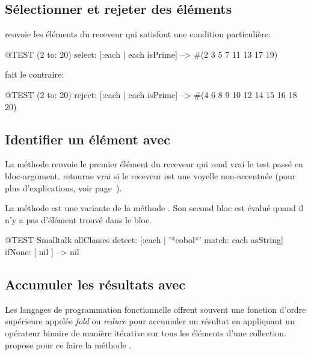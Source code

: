 \documentclass[a4paper,10pt,twoside]{book}
\begin{document}
\subsection{S\'electionner et rejeter des \'el\'ements}

 renvoie les \'el\'ements du receveur qui satisfont
une condition particuli\`ere:

\begin{code}{@TEST}
(2 to: 20) select: [:each | each isPrime] --> #(2 3 5 7 11 13 17 19)
\end{code}

 fait le contraire:
\begin{code}{@TEST}
(2 to: 20) reject: [:each | each isPrime] --> #(4 6 8 9 10 12 14 15 16 18 20)
\end{code}

\subsection{Identifier un \'el\'ement avec }

La m\'ethode  renvoie le premier
\'el\'ement du receveur qui rend vrai le test pass\'e en bloc-argument.
 retourne vrai \cad {} si le receveur est une
voyelle non-accentu\'ee (pour plus d'explications, voir page~\pageref{def:isVowel}).

La m\'ethode  est une variante de la m\'ethode . Son second bloc est \'evalu\'e quand il n'y a pas d'\'el\'ement trouv\'e dans le bloc.

\begin{code}{@TEST}
Smalltalk allClasses detect: [:each | '*cobol*' match: each asString] ifNone: [ nil ] --> nil
\end{code} %

\subsection{Accumuler les r\'esultats avec }
Les langages de programmation fonctionnelle offrent souvent une fonction d'ordre
sup\'erieure appel\'ee \emph{fold} ou \emph{reduce} pour accumuler un r\'esultat
en appliquant un op\'erateur binaire de mani\`ere it\'erative sur tous les
\'el\'ements d'une collection.
\pharo propose pour ce faire la m\'ethode .
\end{document}
